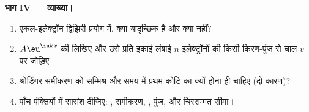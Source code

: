 \begin{problem}[{सप्ताहांत समस्या --- कब कोई इलेक्ट्रॉन कण है,
कब तरंग}]
\textbf{भाग IV --- व्याख्या।}
\begin{enumerate}[resume]
  \item एकल-इलेक्ट्रॉन द्विझिरी प्रयोग में, क्या यादृच्छिक है
        और क्या नहीं?
  \item $A\eu^{\iu kx}$ की  लिखिए और उसे प्रति इकाई
        लंबाई $n$ इलेक्ट्रॉनों की किसी किरण-पुंज से चाल $v$ पर जोड़िए।
  \item श्रोडिंगर समीकरण को सम्मिश्र और समय में प्रथम कोटि का क्यों
        होना ही चाहिए (दो कारण)?
  \item पाँच पंक्तियों में सारांश दीजिए: , समीकरण,
        , पुंज, और चिरसम्मत सीमा।
\end{enumerate}
\end{problem}

